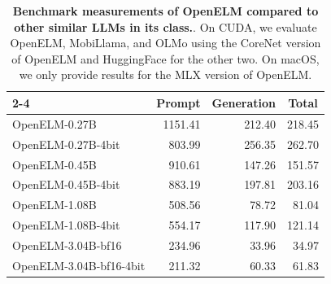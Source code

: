 \documentclass[10pt,twocolumn,letterpaper]{article}
\makeatletter
\newcommand{\model}{OpenELM\@\xspace}
\makeatother
\begin{document}
\begin{table}[t!]
\begin{subtable}[c]{\columnwidth}
{\begin{tabular}{lrrr}
\cmidrule[1.25pt]{2-4}
& \multicolumn{1}{c}{\textbf{Prompt}} & \multicolumn{1}{c}{\textbf{Generation}} & \multicolumn{1}{c}{\textbf{Total}}\\
\midrule[1.25pt]
\model-0.27B & 1151.41 & 212.40 & 218.45         \\
\model-0.27B-4bit & 803.99 & 256.35 & 262.70         \\
\midrule
\model-0.45B & 910.61 & 147.26 & 151.57         \\
\model-0.45B-4bit & 883.19 & 197.81 & 203.16         \\
\midrule
\model-1.08B & 508.56 & 78.72 & 81.04         \\
\model-1.08B-4bit & 554.17 & 117.90 & 121.14         \\
\midrule
\model-3.04B-bf16 & 234.96 & 33.96 & 34.97         \\
\model-3.04B-bf16-4bit & 211.32 & 60.33 & 61.83         \\
\bottomrule[1.5pt]

\end{tabular}
}
\caption{Results for the MLX port on Apple macOS.}
\label{tab:mlx_perf_results}
\end{subtable}
\caption{\textbf{Benchmark measurements of \model compared to other similar LLMs in its class.}. On CUDA, we evaluate \model, MobiLlama, and OLMo using the CoreNet version of \model and HuggingFace for the other two. On macOS, we only provide results for the MLX version of \model.
}
\label{tab:results_benchmark}
\end{table}
\end{document}
